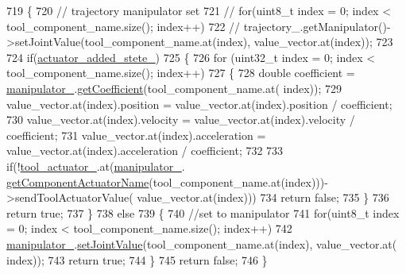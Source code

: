 \begin{DoxyCode}
719 \{
720   \textcolor{comment}{// trajectory manipulator set}
721   \textcolor{comment}{// for(uint8\_t index = 0; index < tool\_component\_name.size(); index++)}
722   \textcolor{comment}{//   trajectory\_.getManipulator()->setJointValue(tool\_component\_name.at(index), value\_vector.at(index));}
723 
724   \textcolor{keywordflow}{if}(\hyperlink{classrobotis__manipulator_1_1_robotis_manipulator_a02073b7982b992642b28acfa35a17769}{actuator\_added\_stete\_})
725   \{
726     \textcolor{keywordflow}{for} (uint32\_t index = 0; index < tool\_component\_name.size(); index++)
727     \{
728       \textcolor{keywordtype}{double} coefficient = \hyperlink{classrobotis__manipulator_1_1_robotis_manipulator_a5b2df4a3b3ee7f408cb1d0eaf61644dc}{manipulator\_}.\hyperlink{classrobotis__manipulator_1_1_manipulator_a437ac5f137aa788c4db07690c185e9ba}{getCoefficient}(tool\_component\_name.at(
      index));
729       value\_vector.at(index).position = value\_vector.at(index).position / coefficient;
730       value\_vector.at(index).velocity = value\_vector.at(index).velocity / coefficient;
731       value\_vector.at(index).acceleration = value\_vector.at(index).acceleration / coefficient;
732 
733       \textcolor{keywordflow}{if}(!\hyperlink{classrobotis__manipulator_1_1_robotis_manipulator_a9d472875a989092466257d14dff2bdcf}{tool\_actuator\_}.at(\hyperlink{classrobotis__manipulator_1_1_robotis_manipulator_a5b2df4a3b3ee7f408cb1d0eaf61644dc}{manipulator\_}.
      \hyperlink{classrobotis__manipulator_1_1_manipulator_a371446cbf4d2d5a572b173d713305fb1}{getComponentActuatorName}(tool\_component\_name.at(index)))->sendToolActuatorValue(
      value\_vector.at(index)))
734         \textcolor{keywordflow}{return} \textcolor{keyword}{false};
735     \}
736     \textcolor{keywordflow}{return} \textcolor{keyword}{true};
737   \}
738   \textcolor{keywordflow}{else}
739   \{
740     \textcolor{comment}{//set to manipulator}
741     \textcolor{keywordflow}{for}(uint8\_t index = 0; index < tool\_component\_name.size(); index++)
742       \hyperlink{classrobotis__manipulator_1_1_robotis_manipulator_a5b2df4a3b3ee7f408cb1d0eaf61644dc}{manipulator\_}.\hyperlink{classrobotis__manipulator_1_1_manipulator_aa740b17551040520851ec8dc1d619bfe}{setJointValue}(tool\_component\_name.at(index), value\_vector.at(
      index));
743     \textcolor{keywordflow}{return} \textcolor{keyword}{true};
744   \}
745   \textcolor{keywordflow}{return} \textcolor{keyword}{false};
746 \}
\end{DoxyCode}


